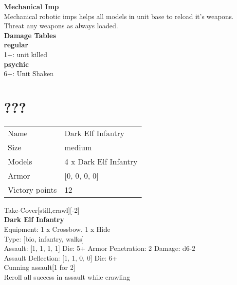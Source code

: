 {\bf Mechanical Imp } \\

Mechanical robotic imps helps all models in unit base to reload it's weapons. Threat any weapons as always loaded.\\ 





 





{\bf Damage Tables} \\
 {\bf regular } \\
1+: unit killed \\
 {\bf psychic } \\
6+: Unit Shaken \\









\pagebreak\pagebreak



\section{???}

\begin{tabular}{ll}
  Name & Dark Elf Infantry\\
  Size & medium\\
  Models & 4 x Dark Elf Infantry\\
  Armor & [0, 0, 0, 0]\\
  Victory points & 12\\
\end{tabular}


Take-Cover[still,crawl][-2]\\ 


{\bf Dark Elf Infantry } \\
Equipment: 1 x Crossbow, 1 x Hide \\
Type: [bio, infantry, walks] \\

Assault: [1, 1, 1, 1] Die: 5+ Armor Penetration: 2 Damage: d6-2 \\
Assault Deflection: [1, 1, 0, 0] Die: 6+\\
\indent Cunning assault[1 for 2]\\ 
Reroll all success in assault while crawling\\ 
 



